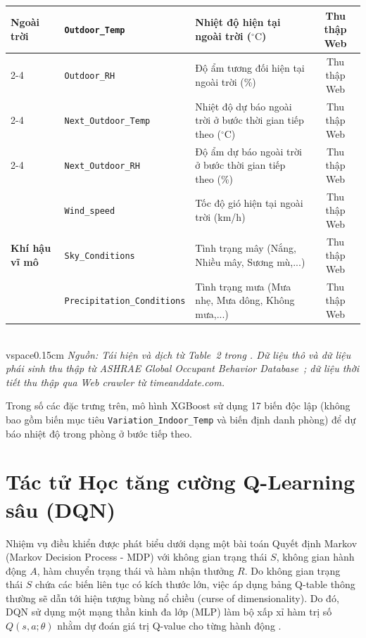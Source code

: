 \documentclass[12pt, a4paper]{report}
\begin{document}
\begin{table}[H]
{\begin{tabular}{|l|l|l|c|}
        \hline
        \multirow{4}{*}{\textbf{Ngoài trời}} & \texttt{Outdoor\_Temp} & Nhiệt độ hiện tại ngoài trời ($^\circ\text{C}$) & Thu thập Web \\
        \cline{2-4}
        & \texttt{Outdoor\_RH} & Độ ẩm tương đối hiện tại ngoài trời (\%) & Thu thập Web \\
        \cline{2-4}
        & \texttt{Next\_Outdoor\_Temp} & Nhiệt độ dự báo ngoài trời ở bước thời gian tiếp theo ($^\circ\text{C}$) & Thu thập Web \\
        \cline{2-4}
        & \texttt{Next\_Outdoor\_RH} & Độ ẩm dự báo ngoài trời ở bước thời gian tiếp theo (\%) & Thu thập Web \\
        \hline
        \multirow{3}{*}{\textbf{Khí hậu vĩ mô}} & \texttt{Wind\_speed} & Tốc độ gió hiện tại ngoài trời (km/h) & Thu thập Web \\
        \cline{2-4}
        & \texttt{Sky\_Conditions} & Tình trạng mây (Nắng, Nhiều mây, Sương mù,...) & Thu thập Web \\
        \cline{2-4}
        & \texttt{Precipitation\_Conditions} & Tình trạng mưa (Mưa nhẹ, Mưa dông, Không mưa,...) & Thu thập Web \\
        \hline
    \end{tabular}%
    }
    \\vspace{0.15cm}
    {\small \textit{Nguồn: Tái hiện và dịch từ Table~2 trong \cite{whulx}. Dữ liệu thô và dữ liệu phái sinh thu thập từ ASHRAE Global Occupant Behavior Database~\cite{ashrae_behavior}; dữ liệu thời tiết thu thập qua Web crawler từ \textit{timeanddate.com}.}}
\end{table}


Trong số các đặc trưng trên, mô hình XGBoost sử dụng 17 biến độc lập (không bao gồm biến mục tiêu \texttt{Variation\_Indoor\_Temp} và biến định danh phòng) để dự báo nhiệt độ trong phòng ở bước tiếp theo.

\section{Tác tử Học tăng cường Q-Learning sâu (DQN)}
Nhiệm vụ điều khiển được phát biểu dưới dạng một bài toán Quyết định Markov (Markov Decision Process - MDP) với không gian trạng thái $S$, không gian hành động $A$, hàm chuyển trạng thái và hàm nhận thưởng $R$. Do không gian trạng thái $S$ chứa các biến liên tục có kích thước lớn, việc áp dụng bảng Q-table thông thường sẽ dẫn tới hiện tượng bùng nổ chiều (curse of dimensionality). Do đó, DQN sử dụng một mạng thần kinh đa lớp (MLP) làm bộ xấp xỉ hàm trị số $Q(s, a; \theta)$ nhằm dự đoán giá trị Q-value cho từng hành động \cite{dqn}.
\end{document}
